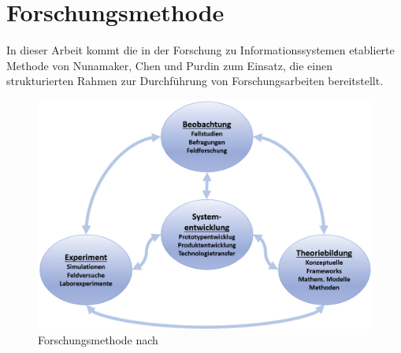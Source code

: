\section{Forschungsmethode}
\label{sec:forschungsmethode}

In dieser Arbeit kommt die in der Forschung zu Informationssystemen etablierte Methode von Nunamaker, Chen und Purdin \cite{nunamaker_systems_1990-1} zum Einsatz, die einen strukturierten Rahmen zur Durchführung von Forschungsarbeiten bereitstellt.

\begin{figure}[h]
    \centering
    \includegraphics[width=\textwidth]{pictures/Nunamaker2.png}
    \caption{Forschungsmethode nach \cite{nunamaker_systems_1990-1}}
    \label{fig:nunamaker}
\end{figure}

